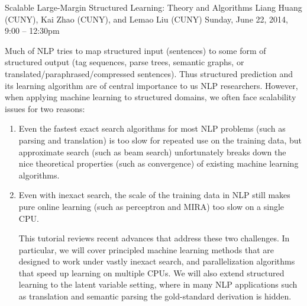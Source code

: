 \begin{tutorial}{Scalable Large-Margin Structured Learning: Theory and Algorithms}
  {Liang Huang (CUNY), Kai Zhao (CUNY), and Lemao Liu (CUNY)}
  {Sunday, June 22, 2014, 9:00 -- 12:30pm}
  {\TutLocB}

Much of NLP tries to map structured input (sentences) to some form of
structured output (tag sequences, parse trees, semantic graphs, or
translated/paraphrased/compressed sentences). Thus structured
prediction and its learning algorithm are of central importance to us
NLP researchers. However, when applying machine learning to structured
domains, we often face scalability issues for two reasons:

\begin{enumerate}
\item Even the fastest exact search algorithms for most NLP problems
(such as parsing and translation) is too slow for repeated use on the
training data, but approximate search (such as beam search)
unfortunately breaks down the nice theoretical properties (such as
convergence) of existing machine learning algorithms.

\item Even with inexact search, the scale of the training data in NLP
still makes pure online learning (such as perceptron and MIRA) too
slow on a single CPU.

This tutorial reviews recent advances that address these two
challenges. In particular, we will cover principled machine learning
methods that are designed to work under vastly inexact search, and
parallelization algorithms that speed up learning on multiple CPUs. We
will also extend structured learning to the latent variable setting,
where in many NLP applications such as translation and semantic
parsing the gold-standard derivation is hidden.
\end{enumerate}

\end{tutorial}
